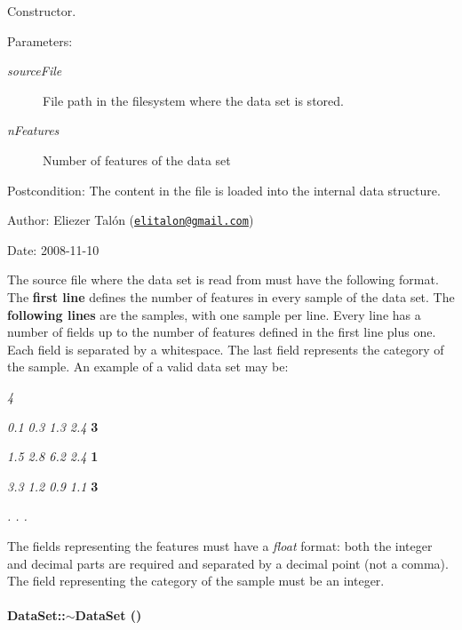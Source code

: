 Constructor. 

\begin{Desc}
\item[Parameters:]
\begin{description}
\item[{\em sourceFile}]File path in the filesystem where the data set is stored. \item[{\em nFeatures}]Number of features of the data set\end{description}
\end{Desc}
\begin{Desc}
\item[Postcondition:]The content in the file is loaded into the internal data structure.\end{Desc}
\begin{Desc}
\item[Author:]Eliezer Talón (\href{mailto:elitalon@gmail.com}{\tt elitalon@gmail.com}) \end{Desc}
\begin{Desc}
\item[Date:]2008-11-10\end{Desc}
The source file where the data set is read from must have the following format. The {\bf first line} defines the number of features in every sample of the data set. The {\bf following lines} are the samples, with one sample per line. Every line has a number of fields up to the number of features defined in the first line plus one. Each field is separated by a whitespace. The last field represents the category of the sample. An example of a valid data set may be:

{\em 4\/}

{\em 0.1 0.3 1.3 2.4\/} {\bf 3}

{\em 1.5 2.8 6.2 2.4\/} {\bf 1}

{\em 3.3 1.2 0.9 1.1\/} {\bf 3}

{\em . . .\/}

The fields representing the features must have a {\em float\/} format: both the integer and decimal parts are required and separated by a decimal point (not a comma). The field representing the category of the sample must be an integer. \hypertarget{class_data_set_2cdb84d32331956b413ca36933e516bd}{
\paragraph[{$\sim$DataSet}]{\setlength{\rightskip}{0pt plus 5cm}DataSet::$\sim$DataSet ()}\hfill}
\label{class_data_set_2cdb84d32331956b413ca36933e516bd}


